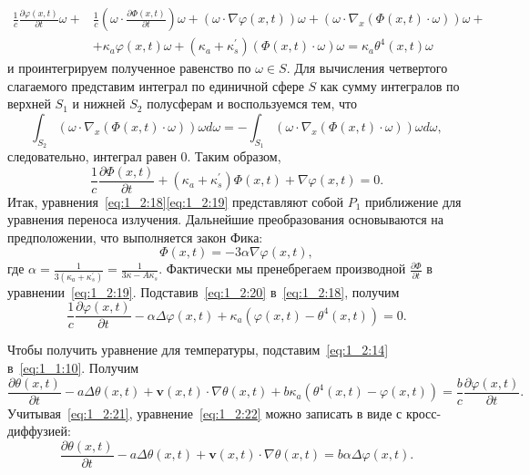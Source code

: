 \[
    \begin{aligned}
        \frac{1}{c} \frac{\partial \varphi(x, t)}{\partial t} \omega+&
        \frac{1}{c}\left(\omega \cdot \frac{\partial \Phi(x, t)}{\partial t}\right)
        \omega+(\omega \cdot \nabla \varphi(x, t)) \omega
        +\left(\omega \cdot \nabla_{x}(\Phi(x, t)
        \cdot \omega)\right) \omega+\\
        &+\kappa_{a} \varphi(x, t) \omega+\left(\kappa_{a}
        +\kappa_{s}^{\prime}\right)(\Phi(x, t)
        \cdot \omega) \omega=\kappa_{a} \theta^{4}(x, t) \omega
    \end{aligned}
\]
и проинтегрируем полученное равенство по $\omega \in S$.
Для вычисления четвертого слагаемого представим интеграл по единичной сфере $S$
как сумму интегралов по верхней $S_{1}$ и нижней $S_{2}$ полусферам и воспользуемся тем, что
\[
    \int_{S_{2}}\left(\omega \cdot \nabla_{x}(\Phi(x, t)
    \cdot \omega)\right) \omega d
    \omega=-\int_{S_{1}}\left(\omega \cdot \nabla_{x}(\Phi(x, t)
    \cdot \omega)\right) \omega d \omega,
\]
следовательно, интеграл равен 0.
Таким образом,
\begin{equation}
    \label{eq:1_2:19}
    \frac{1}{c} \frac{\partial \Phi(x, t)}{\partial t}
    + \left(\kappa_{a}+\kappa_{s}^{\prime}\right)
    \Phi(x, t)+\nabla \varphi(x, t)=0.
\end{equation}
Итак, уравнения~\eqref{eq:1_2:18}\eqref{eq:1_2:19}
представляют собой $P_{1}$ приближение
для уравнения переноса излучения.
Дальнейшие преобразования основываются на предположении, что выполняется закон Фика:
\begin{equation}
    \label{eq:1_2:20}
    \Phi(x, t)=-3 \alpha \nabla \varphi(x, t),
\end{equation}
где $\alpha=\frac{1}{3\left(\kappa_{a}+\kappa_{s}^{\prime}\right)}
=\frac{1}{3 \kappa-A \kappa_{s}}$.
Фактически мы пренебрегаем производной
$\frac{\partial \Phi}{\partial t}$ в уравнении~\eqref{eq:1_2:19}.
Подставив~\eqref{eq:1_2:20} в~\eqref{eq:1_2:18}, получим
\begin{equation}
    \label{eq:1_2:21}
    \frac{1}{c} \frac{\partial \varphi(x, t)}{\partial t}-\alpha \Delta
    \varphi(x, t)+\kappa_{a}\left(\varphi(x, t)-\theta^{4}(x, t)\right)=0.
\end{equation}


Чтобы получить уравнение для температуры, подставим~\eqref{eq:1_2:14} в~\eqref{eq:1_1:10}.
Получим
\begin{equation}
    \label{eq:1_2:22}
    \frac{\partial \theta(x, t)}{\partial t}-a \Delta \theta(x, t)+\mathbf{v}(x, t) \cdot
    \nabla \theta(x, t)+b \kappa_{a}\left(\theta^{4}(x, t)-\varphi(x, t)\right)=\frac{b}{c}
    \frac{\partial \varphi(x, t)}{\partial t}.
\end{equation}
Учитывая~\eqref{eq:1_2:21}, уравнение~\eqref{eq:1_2:22} можно записать в виде с кросс-диффузией:
\[
    \frac{\partial \theta(x, t)}{\partial t}-a \Delta \theta(x, t)+\mathbf{v}(x, t) \cdot
    \nabla \theta(x, t)=b \alpha \Delta \varphi(x, t).
\]

